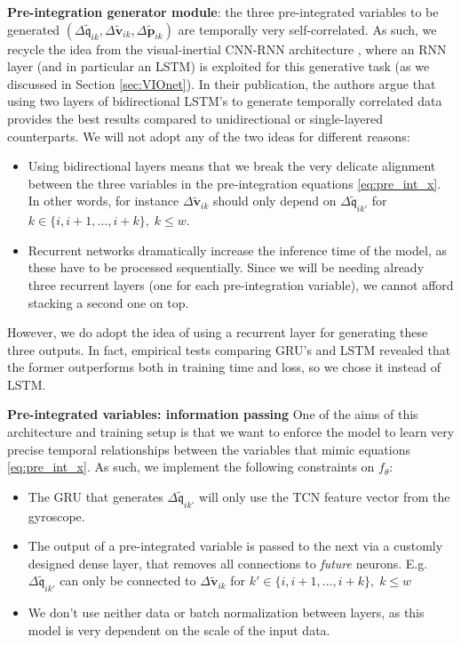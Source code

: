 \textbf{Pre-integration generator module}: the three pre-integrated variables to be generated $(\Delta\mathfrak{\tilde{q}}_{ik}, \Delta\mathbf{\tilde{v}}_{ik}, \Delta\mathbf{\tilde{p}}_{ik})$ are temporally very self-correlated. 
As such, we recycle the idea from the visual-inertial CNN-RNN architecture \cite{DBLP:journals/corr/ClarkWWMT17}, where an RNN layer (and in particular an LSTM) is exploited for this generative task (as we discussed in Section \ref{sec:VIOnet}). 
In their publication, the authors argue that using two layers of bidirectional LSTM's to generate temporally correlated data provides the best results compared to unidirectional or single-layered counterparts. 
We will not adopt any of the two ideas for different reasons:
\begin{itemize}
    \item Using bidirectional layers means that we break the very delicate alignment between the three variables in the pre-integration equations \ref{eq:pre_int_x}.
    In other words, for instance $\Delta\mathbf{\tilde{v}}_{ik}$ should only depend on $\Delta\mathfrak{\tilde{q}}_{ik'}$ for $k \in \{i, i+1, ..., i+k\}, \; k \leq w$. 
    \item Recurrent networks dramatically increase the inference time of the model, as these have to be processed sequentially.
    Since we will be needing already three recurrent layers (one for each pre-integration variable), we cannot afford stacking a second one on top.
\end{itemize}
However, we do adopt the idea of using a recurrent layer for generating these three outputs. 
In fact, empirical tests comparing GRU's \cite{DBLP:journals/corr/ChoMGBSB14} and LSTM revealed that the former outperforms both in training time and loss, so we chose it instead of LSTM.

\textbf{Pre-integrated variables: information passing}
One of the aims of this architecture and training setup is that we want to enforce the model to learn very precise temporal relationships between the variables that mimic equations \ref{eq:pre_int_x}.
As such, we implement the following constraints on $f_\theta$:
\begin{itemize}
    \item The GRU that generates $\Delta\mathfrak{\tilde{q}}_{ik'}$ will only use the TCN feature vector from the gyroscope.
    \item The output of a pre-integrated variable is passed to the next via a customly designed dense layer, that removes all connections to \emph{future} neurons. 
    E.g. $\Delta\mathfrak{\tilde{q}}_{ik'}$ can only be connected to $\Delta\mathbf{\tilde{v}}_{ik}$ for $k' \in \{i, i+1, ..., i+k\}, \; k \leq w$
    \item We don't use neither data or batch normalization between layers, as this model is very dependent on the scale of the input data.
\end{itemize}


